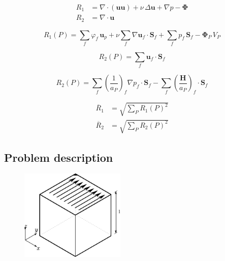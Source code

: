 \documentclass[final,3p,times,10pt,onecolumn]{myElsarticle}
\numberwithin{equation}{section}
\begin{document}
\begin{align}
R_1
&=
\nabla
\cdot
\left(
\boldsymbol{u}
\boldsymbol{u}
\right)
+
\nu\, \Delta \boldsymbol{u}
+
\nabla p 
-
\boldsymbol{\Phi}
\\
R_2
&=
\nabla
\cdot
\boldsymbol{u}
\end{align}

\begin{equation}
R_1(P)
=
\sum_{f}
\varphi_f\,
\boldsymbol{u}_p
+
\nu
\sum_f
\nabla \boldsymbol{u}_f
\cdot
\boldsymbol{S}_f
+
\sum_f
p_f
\,
\boldsymbol{S}_f
-
\boldsymbol{\Phi}_P \, V_P
\end{equation}

\begin{equation}
R_2(P)
=
\sum_f
\boldsymbol{u}_f
\cdot
\boldsymbol{S}_f
\end{equation}

\begin{equation}
R_2(P)
=
\sum_f 
\left(
\frac{1}{a_P}
\right)_f 
\nabla p_f
\cdot
\boldsymbol{S}_f 
-
\sum_f
\left(
\frac{\boldsymbol{H}}
{a_P}
\right)_f 
\cdot 
\boldsymbol{S}_f 
\end{equation}

\begin{align}
\overline{R}_1
&=
\sqrt
{
\sum_P
R_1(P)^2
}
\\
\overline{R}_2
&=
\sqrt
{
\sum_P
R_2(P)^2
}
\end{align}






\subsection{Problem description}

\begin{figure}[H]
\centering
\includegraphics[width=5cm]{fig/Cases/Cavity.pdf}
\caption{}
\label{Fig:Cavity}
\end{figure}  
\end{document}
